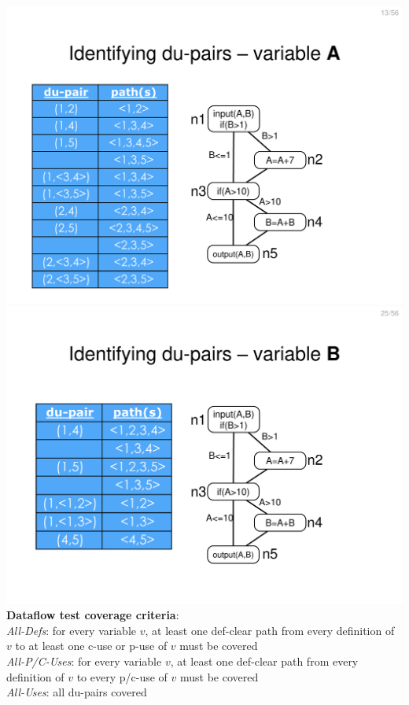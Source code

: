 \documentclass[a4paper]{article}
\begin{document}
\begin{multicols}{3}
        \includegraphics[width=\linewidth]{167.pdf}\\
        \includegraphics[width=\linewidth]{179.pdf}\\
        \textbf{\textbf{Dataflow test coverage criteria}}:\\
        \textit{All-Defs}: for every variable $v$, at least one def-clear path from every definition of $v$ to at least one c-use or p-use of $v$ must be covered\\
        \textit{All-P/C-Uses}: for every variable $v$, at least one def-clear path from every definition of $v$ to every p/c-use of $v$ must be covered\\
        \textit{All-Uses}: all du-pairs covered\\

\end{multicols}
\end{document}
